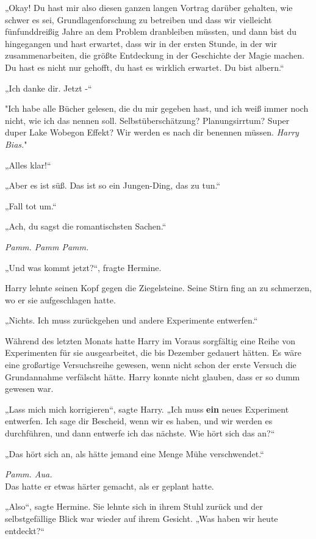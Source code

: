 {„Okay! Du hast mir also diesen ganzen langen Vortrag darüber gehalten, wie schwer es sei, Grundlagenforschung zu betreiben und dass wir vielleicht fünfunddreißig Jahre an dem Problem dranbleiben müssten, und dann bist du hingegangen und hast erwartet, dass wir in der ersten Stunde, in der wir zusammenarbeiten, die größte Entdeckung in der Geschichte der Magie machen. Du hast es nicht nur gehofft, du hast es wirklich erwartet. Du bist albern.“

„Ich danke dir. Jetzt -“

"Ich habe alle Bücher gelesen, die du mir gegeben hast, und ich weiß immer noch nicht, wie ich das nennen soll. Selbstüberschätzung? Planungsirrtum? Super duper Lake Wobegon Effekt? Wir werden es nach dir benennen müssen. \emph{Harry Bias.}"

„Alles klar!“

„Aber es ist süß. Das ist so ein Jungen-Ding, das zu tun.“

„Fall tot um.“

„Ach, du sagst die romantischsten Sachen.“

\emph{Pamm. Pamm Pamm.}

„Und was kommt jetzt?“, fragte Hermine.

Harry lehnte seinen Kopf gegen die Ziegelsteine. Seine Stirn fing an zu schmerzen, wo er sie aufgeschlagen hatte.

„Nichts. Ich muss zurückgehen und andere Experimente entwerfen.“

Während des letzten Monats hatte Harry im Voraus sorgfältig eine Reihe von Experimenten für sie ausgearbeitet, die bis Dezember gedauert hätten. Es wäre eine großartige Versuchsreihe gewesen, wenn nicht schon der erste Versuch die Grundannahme verfälscht hätte. Harry konnte nicht glauben, dass er so dumm gewesen war.

„Lass mich mich korrigieren“, sagte Harry. „Ich muss \textbf{ein} neues Experiment entwerfen. Ich sage dir Bescheid, wenn wir es haben, und wir werden es durchführen, und dann entwerfe ich das nächste. Wie hört sich das an?“

„Das hört sich an, als hätte jemand eine Menge Mühe verschwendet.“

\emph{Pamm. Aua.}\\ Das hatte er etwas härter gemacht, als er geplant hatte.

„Also“, sagte Hermine. Sie lehnte sich in ihrem Stuhl zurück und der selbstgefällige Blick war wieder auf ihrem Gesicht. „Was haben wir heute entdeckt?“

}
